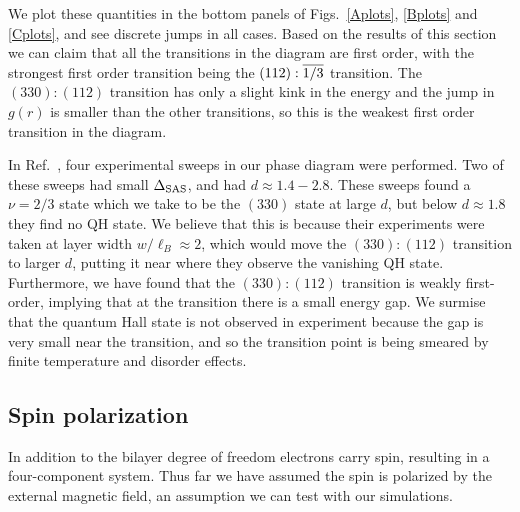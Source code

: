 We plot these quantities in the bottom panels of Figs.~\ref{Aplots}, \ref{Bplots} and \ref{Cplots}, and see discrete jumps in all cases.
Based on the results of this section we can claim that all the transitions in the diagram are first order, with the strongest first order transition being the $(112):\overline{1/3}$ transition. The $(330):(112)$ transition has only a slight kink in the energy and the jump in $g(r)$ is smaller than the other transitions, so this is the weakest first order transition in the diagram.

In Ref.~\cite{Hirayama2004}, four experimental sweeps in our phase diagram were performed. Two of these sweeps had small $\Delta_\textrm{SAS}$, and had $d\approx1.4-2.8$. These sweeps found a $\nu=2/3$ state which we take to be the $(330)$ state at large $d$, but below $d\approx1.8$ they find no QH state. 
We believe that this is because their experiments were taken at layer width $w/\ell_B\approx2$, which would move the $(330):(112)$ transition to larger $d$, putting it near where they observe the vanishing QH state. 
Furthermore, we have found that the $(330):(112)$ transition is weakly first-order, implying that at the transition there is a small energy gap. 
We surmise that the quantum Hall state is not observed in experiment because the gap is very small near the transition, and so the transition point is being smeared by finite temperature and disorder effects.

\subsection{Spin polarization}\label{sec:polarization}

In addition to the bilayer degree of freedom electrons carry spin, resulting in a four-component system.
Thus far we have assumed the spin is polarized by the external magnetic field, an assumption we can test with our simulations. 

